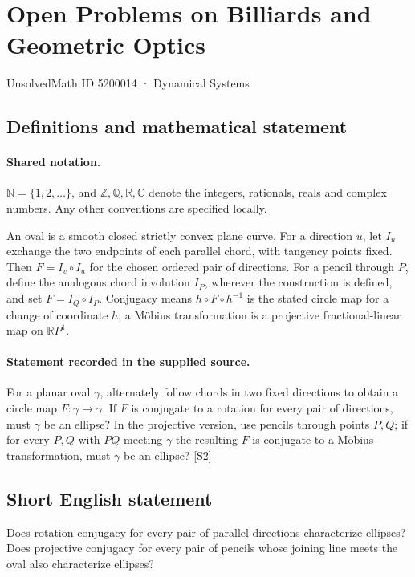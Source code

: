 \documentclass[11pt]{article}
\newcommand{\sref}[2]{\hyperlink{source:#1:#2}{[S#2]}}
\begin{document}
\setcounter{section}{5200013}
\section{Open Problems on Billiards and Geometric Optics}\label{5200014}
{\small\sffamily UnsolvedMath ID 5200014 · Dynamical Systems}
\subsection{Definitions and mathematical statement}

\paragraph{Shared notation.}$\mathbb N=\{1,2,\ldots\}$, and $\mathbb Z,\mathbb Q,\mathbb R,\mathbb C$ denote the integers, rationals, reals and complex numbers. Any other conventions are specified locally.


An oval is a smooth closed strictly convex plane curve. For a direction $u$, let $I_u$ exchange the two endpoints of each parallel chord, with tangency points fixed. Then $F=I_v\circ I_u$ for the chosen ordered pair of directions. For a pencil through $P$, define the analogous chord involution $I_P$, wherever the construction is defined, and set $F=I_Q\circ I_P$. Conjugacy means $h\circ F\circ h^{-1}$ is the stated circle map for a change of coordinate $h$; a M\"obius transformation is a projective fractional-linear map on $\mathbb RP^1$.
\paragraph{Statement recorded in the supplied source.}
For a planar oval $\gamma$, alternately follow chords in two fixed directions to obtain a circle map $F:\gamma\to\gamma$. If $F$ is conjugate to a rotation for every pair of directions, must $\gamma$ be an ellipse? In the projective version, use pencils through points $P,Q$; if for every $P,Q$ with $PQ$ meeting $\gamma$ the resulting $F$ is conjugate to a Möbius transformation, must $\gamma$ be an ellipse? \sref{5200014}{2}
\subsection{Short English statement}
Does rotation conjugacy for every pair of parallel directions characterize ellipses? Does projective conjugacy for every pair of pencils whose joining line meets the oval also characterize ellipses?
\end{document}

